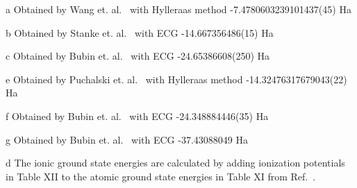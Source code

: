 \begin{table*}[t!]
\begin{threeparttable}
\begin{tablenotes}
\item[a] Obtained by Wang et. al.~\cite{Wang_Li} with Hylleraas method -7.4780603239101437(45) Ha
\item[b] Obtained by Stanke et. al.~\cite{Stanke_Be} with ECG -14.667356486(15) Ha
\item[c] Obtained by Bubin et. al.~\cite{Bubin_B} with ECG -24.65386608(250) Ha
\item[e] Obtained by Puchalski et. al.~\cite{Puchalski_Be+} with Hylleraas method -14.32476317679043(22) Ha
\item[f] Obtained by Bubin et. al.~\cite{Bubin_B+} with ECG -24.348884446(35) Ha
\item[g] Obtained by Bubin et. al.~\cite{Bubin_C+} with ECG -37.43088049 Ha
\item[d] The ionic ground state energies are calculated by adding ionization potentials in Table XII to the atomic ground state energies in Table XI from Ref.~\cite{Davidson_Atoms}.
\end{tablenotes}

\end{threeparttable}
\end{table*}